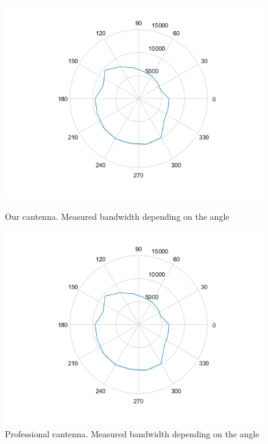 \documentclass[12pt,a4paper]{article}
\newcommand{\figurewidth}[0]{.65\textwidth}
\begin{document}
\begin{figure}\begin{center}
	\includegraphics[width=\figurewidth]{plots/polar_can_b.png}
	\caption{Our cantenna. Measured bandwidth depending on the angle}
	\label{img:ang:band:can}

	\includegraphics[width=\figurewidth]{plots/polar_prof_b.png}
	\caption{Professional cantenna. Measured bandwidth depending on the angle}
	\label{img:ang:band:prof}


\end{center}
\end{figure}
\end{document}
